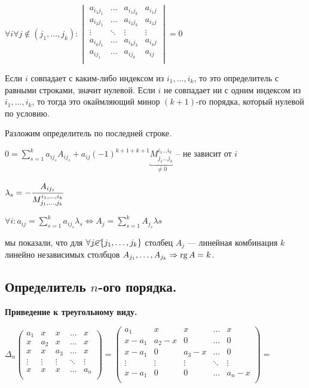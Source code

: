 \(\forall i \forall j \notin(j_1,
\ldots, j_k):
\begin{vmatrix}
    a_{i_1 j_1} & \ldots & a_{i_1 j_k} & a_{i_1 j} \\
    a_{i_2 j_1} & \ldots & a_{i_2 j_k} & a_{i_2 j} \\
    \vdots      & \ddots & \vdots      & \vdots    \\
    a_{i_k j_1} & \ldots & a_{i_k j_k} & a_{i_k j} \\
    a_{i j_1}   & \ldots & a_{i j_k}   & a_{i j}   \\
\end{vmatrix} = 0\)

Если \(i\) совпадает с каким-либо индексом из \(i_1, \ldots, i_k\), то это определитель с равными строками, значит нулевой. Если \(i\) не совпадает ни с одним индексом из \(i_1, \ldots, i_k\), то тогда это окаймляющий минор \((k + 1)\)-го порядка, который нулевой по условию.

Разложим определитель по последней строке.

\( 0  = \sum\limits_{s=1}^{k} a_{i j_s} A_{ij_s} + a_{ij} (-1)^{k+1+k+1} \underbracket{M_{j_1\ldots j_k}^{i_1 \ldots i_k}}_{\neq 0}\) -- не зависит от $i$

\(\lambda_s=-\cfrac{A_{ij_s}}{M_{j_1,\dots,j_k}^{i_1, \dots, i_k}}\)

\(\forall i : a_{ij} = \sum\limits_{s=1}^{k}a_{ij_s} \lambda_s \Leftrightarrow A_j = \sum\limits_{s=1}^{k}  A_{j_s} \lambda s\)

мы показали, что для \(\forall j \cancel{\in} \{j_1,\ldots,j_k\}\) столбец $A_{j}$ --- линейная комбинация $k$ линейно независимых столбцов $A_{j_1}, \dots, A_{j_k} \Rightarrow \operatorname{rg} A = k$.


\subsection{Определитель \(n\)-ого порядка.}


\textbf{Приведение к треугольному виду.}

\( \Delta_n \begin{pmatrix}
    a_1    & x      & x      & \ldots & x      \\
    x      & a_2    & x      & \ldots & x      \\
    x      & x      & a_3    & \ldots & x      \\
    \vdots & \vdots & \vdots & \ddots & \vdots \\
    x      & x      & x      & \ldots & a_n    \\
\end{pmatrix}
=
\begin{pmatrix}
    a_1    & x       & x      & \ldots & x      \\
    x-a_1  & a_2 - x & 0      & \ldots & 0      \\
    x-a_1  & 0       & a_3 -x & \ldots & 0      \\
    \vdots & \vdots  & \vdots & \ddots & \vdots \\
    x-a_1  & 0       & 0      & \ldots & a_n-x  \\
\end{pmatrix}
=\)


